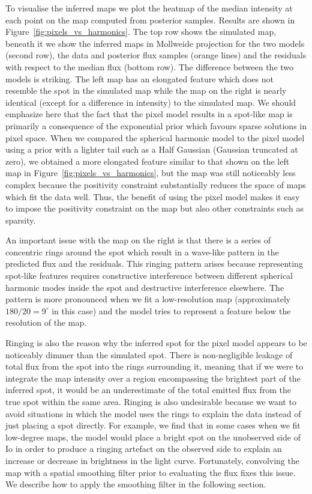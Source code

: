 \documentclass[12pt,dvipsnames]{report}
\begin{document}
To visualise the inferred maps we plot the heatmap of the median intensity at each point on the map computed from posterior samples.
Results are shown in Figure~\ref{fig:pixels_vs_harmonics}.
The top row shows the simulated map, beneath it we show the inferred maps in Mollweide projection for the two models (second row), the data and posterior flux samples (orange lines) and the residuals with respect to the median flux (bottom row).
The difference between the two models is striking. 
The left map has an elongated feature which does not resemble the spot in the simulated map while the map on the right is nearly identical (except for a difference in intensity) to the simulated map. 
We should emphasize here that the fact that the pixel model results in a spot-like map is 
primarily a consequence of the exponential prior which favours sparse solutions in pixel space.
When we compared the spherical harmonic model to the pixel model using a prior with a lighter tail such as a Half Gaussian (Gaussian truncated at zero), we obtained a more elongated feature similar to that shown on the left map in Figure~\ref{fig:pixels_vs_harmonics}, but the map was still noticeably less complex because the positivity constraint substantially reduces the space of maps which fit the data well. 
Thus, the benefit of using the pixel model makes it easy to impose the positivity constraint on the map but also other constraints such as sparsity.

An important issue with the map on the right is that there is a series of concentric rings around the spot which result in a wave-like pattern in the predicted flux and the residuals.
This ringing pattern arises because representing spot-like features requires constructive interference between different spherical harmonic modes inside the spot and destructive interference elsewhere.
The pattern is more pronounced when we fit a low-resolution map (approximately $180/20=9^\circ$ in this case) and the model tries to represent a feature below the resolution of the map.

Ringing is also the reason why the inferred spot for the pixel model appears to be noticeably dimmer than the simulated spot.
There is non-negligible leakage of total flux from the spot into the rings surrounding it, meaning that if we were to integrate the map intensity over a region encompassing the brightest part of the inferred spot, it would be an underestimate of the total emitted flux from the true spot within the same area.
Ringing is also undesirable because we want to avoid situations in which the model uses the rings to explain the data instead of just placing a spot directly. 
For example, we find that in some cases when we fit low-degree maps, the model would place a bright spot on the unobserved side of Io in order to produce a ringing artefact on the observed side to explain an increase or decrease in brightness in the light curve. 
Fortunately, convolving the map with a spatial smoothing filter prior to evaluating the flux fixes this issue. 
We describe how to apply the smoothing filter in the following section.
\end{document}

